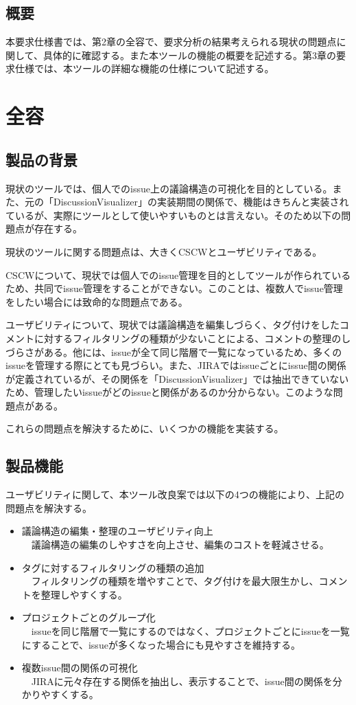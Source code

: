 \documentclass[12pt, oneside]{jreport}
\begin{document}
	\newpage
	
	\section{概要}
	本要求仕様書では、第2章の全容で、要求分析の結果考えられる現状の問題点に関して、具体的に確認する。また本ツールの機能の概要を記述する。第3章の要求仕様では、本ツールの詳細な機能の仕様について記述する。
	

\chapter{全容}

	\section{製品の背景}
	現状のツールでは、個人でのissue上の議論構造の可視化を目的としている。また、元の「DiscussionVisualizer」の実装期間の関係で、機能はきちんと実装されているが、実際にツールとして使いやすいものとは言えない。そのため以下の問題点が存在する。
	
	現状のツールに関する問題点は、大きくCSCWとユーザビリティである。
	
	CSCWについて、現状では個人でのissue管理を目的としてツールが作られているため、共同でissue管理をすることができない。このことは、複数人でissue管理をしたい場合には致命的な問題点である。
	
	ユーザビリティについて、現状では議論構造を編集しづらく、タグ付けをしたコメントに対するフィルタリングの種類が少ないことによる、コメントの整理のしづらさがある。他には、issueが全て同じ階層で一覧になっているため、多くのissueを管理する際にとても見づらい。また、JIRAではissueごとにissue間の関係が定義されているが、その関係を「DiscussionVisualizer」では抽出できていないため、管理したいissueがどのissueと関係があるのか分からない。このような問題点がある。
	
	これらの問題点を解決するために、いくつかの機能を実装する。
	
	\section{製品機能}
	ユーザビリティに関して、本ツール改良案では以下の4つの機能により、上記の問題点を解決する。
	\begin{itemize}
		\item 議論構造の編集・整理のユーザビリティ向上
		\\
		　議論構造の編集のしやすさを向上させ、編集のコストを軽減させる。
		\item タグに対するフィルタリングの種類の追加
		\\
		　フィルタリングの種類を増やすことで、タグ付けを最大限生かし、コメントを整理しやすくする。
		\item プロジェクトごとのグループ化
		\\
		　issueを同じ階層で一覧にするのではなく、プロジェクトごとにissueを一覧にすることで、issueが多くなった場合にも見やすさを維持する。
		\item 複数issue間の関係の可視化
		\\
		　JIRAに元々存在する関係を抽出し、表示することで、issue間の関係を分かりやすくする。
	\end{itemize}
	
\end{document}
